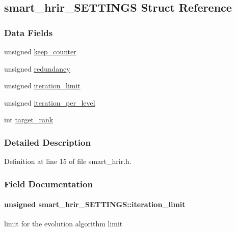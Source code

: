\hypertarget{a00002}{\subsection{smart\-\_\-hrir\-\_\-\-S\-E\-T\-T\-I\-N\-G\-S Struct Reference}
\label{a00002}
}
\subsubsection*{Data Fields}
\begin{DoxyCompactItemize}
\item 
unsigned \hyperlink{a00002_a714475150bd7fe12b306d68785f67141}{keep\-\_\-counter}
\item 
unsigned \hyperlink{a00002_ab061b89916ebae7f98218891bfa2f436}{redundancy}
\item 
unsigned \hyperlink{a00002_a6cb490509e72b23c2327e4c613f317e2}{iteration\-\_\-limit}
\item 
unsigned \hyperlink{a00002_a5733558db24a20e91e237bc34eefa0dc}{iteration\-\_\-per\-\_\-level}
\item 
int \hyperlink{a00002_a7fe041024e3b80d4432497f6be9c7b8f}{target\-\_\-rank}
\end{DoxyCompactItemize}


\subsubsection{Detailed Description}


Definition at line 15 of file smart\-\_\-hrir.\-h.



\subsubsection{Field Documentation}
\hypertarget{a00002_a6cb490509e72b23c2327e4c613f317e2}{
\paragraph[{iteration\-\_\-limit}]{\setlength{\rightskip}{0pt plus 5cm}unsigned smart\-\_\-hrir\-\_\-\-S\-E\-T\-T\-I\-N\-G\-S\-::iteration\-\_\-limit}}\label{a00002_a6cb490509e72b23c2327e4c613f317e2}
limit for the evolution algorithm limit 

